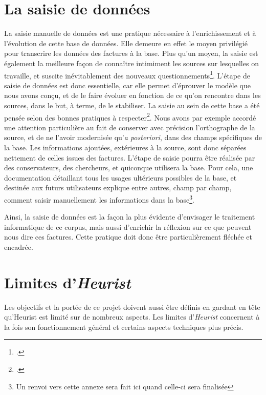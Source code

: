 \newpage

\section{La saisie de données}

La saisie manuelle de données est une pratique nécessaire à l'enrichissement et à l'évolution de cette base de données. Elle demeure en effet le moyen privilégié pour transcrire les données des factures à la base. Plus qu'un moyen, la saisie est également la meilleure façon de connaître intimiment les sources sur lesquelles on travaille, et suscite inévitablement des nouveaux questionnements\footcite{Lemercier_Zalc_2008}. L'étape de saisie de données est donc essentielle, car elle permet d'éprouver le modèle que nous avons conçu, et de le faire évoluer en fonction de ce qu'on rencontre dans les sources, dans le but, à terme, de le stabiliser. 
La saisie au sein de cette base a été pensée selon des bonnes pratiques à respecter\footcite[Voir les dix commandements  de la saisie]{Lemercier_Zalc_2008}. Nous avons par exemple accordé une attention particulière au fait de conserver avec précision l'orthographe de la source, et de ne l'avoir modernisée qu'\emph{a posteriori}, dans des champs spécifiques de la base. Les informations ajoutées, extérieures à la source, sont donc  séparées nettement de celles issues des factures. 
L'étape de saisie pourra être réalisée par des conservateurs, des chercheurs, et quiconque utilisera la base. Pour cela, une documentation détaillant tous les usages ultérieurs possibles de la base, et destinée aux futurs utilisateurs explique entre autres, champ par champ, comment saisir manuellement les informations dans la base\footnote{Un renvoi vers cette annexe sera fait ici quand celle-ci sera finalisée}. 

Ainsi, la saisie de données est la façon la plus évidente d'envisager le traitement informatique de ce corpus, mais aussi d'enrichir la réflexion sur ce que peuvent nous dire ces factures. Cette pratique doit donc être particulièrement fléchée et encadrée. 


\section{Limites d'\emph{Heurist}}


Les objectifs et la portée de ce projet doivent aussi être définis en gardant en tête qu'Heurist est limité sur de nombreux aspects. 
Les limites d'\emph{Heurist} concernent à la fois son fonctionnement général et certains aspects techniques plus précis. 

